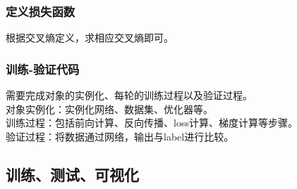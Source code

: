 \documentclass[UTF8, a4paper]{article}
\begin{document}
\subsubsection{定义损失函数}
根据交叉熵定义，求相应交叉熵即可。
\subsubsection{训练-验证代码}
需要完成对象的实例化、每轮的训练过程以及验证过程。\\
对象实例化：实例化网络、数据集、优化器等。\\
训练过程：包括前向计算、反向传播、loss计算、梯度计算等步骤。\\
验证过程：将数据通过网络，输出与label进行比较。

\subsection{训练、测试、可视化}
\end{document}
